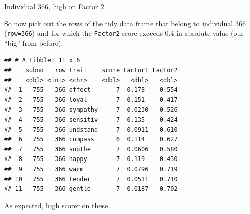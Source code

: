 \documentclass[
  ignorenonframetext,
]{beamer}
\newenvironment{Shaded}{\begin{snugshade}}{\end{snugshade}}
\newcommand{\DecValTok}[1]{\textcolor[rgb]{0.00,0.00,0.81}{#1}}
\newcommand{\FloatTok}[1]{\textcolor[rgb]{0.00,0.00,0.81}{#1}}
\newcommand{\KeywordTok}[1]{\textcolor[rgb]{0.13,0.29,0.53}{\textbf{#1}}}
\newcommand{\NormalTok}[1]{#1}
\newcommand{\OperatorTok}[1]{\textcolor[rgb]{0.81,0.36,0.00}{\textbf{#1}}}
\newcommand{\StringTok}[1]{\textcolor[rgb]{0.31,0.60,0.02}{#1}}
\begin{document}
\begin{frame}[fragile]{Individual 366, high on Factor 2}
\protect\hypertarget{individual-366-high-on-factor-2}{}

So now pick out the rows of the tidy data frame that belong to
individual 366 (\texttt{row=366}) and for which the \texttt{Factor2}
score exceeds 0.4 in absolute value (our ``big'' from before):

\scriptsize

\begin{Shaded}
\end{Shaded}

\begin{verbatim}
## # A tibble: 11 x 6
##    subno   row trait    score Factor1 Factor2
##    <dbl> <int> <chr>    <dbl>   <dbl>   <dbl>
##  1   755   366 affect       7  0.178    0.554
##  2   755   366 loyal        7  0.151    0.417
##  3   755   366 sympathy     7  0.0230   0.526
##  4   755   366 sensitiv     7  0.135    0.424
##  5   755   366 undstand     7  0.0911   0.610
##  6   755   366 compass      6  0.114    0.627
##  7   755   366 soothe       7  0.0606   0.580
##  8   755   366 happy        7  0.119    0.430
##  9   755   366 warm         7  0.0796   0.719
## 10   755   366 tender       7  0.0511   0.710
## 11   755   366 gentle       7 -0.0187   0.702
\end{verbatim}

\normalsize

As expected, high scorer on these.

\end{frame}
\end{document}

